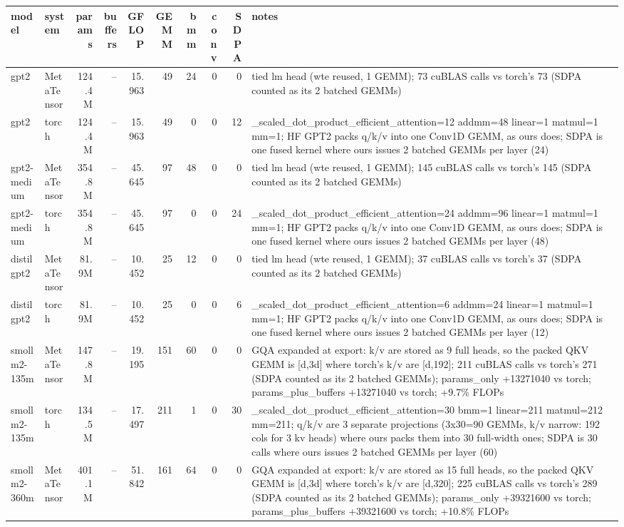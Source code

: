 \begin{tabular}{llrrrrrrrp{}}
\toprule
model & system & params & buffers & GFLOP & GEMM & bmm & conv & SDPA & notes \\
\midrule
gpt2 & MetaTensor & 124.4M & -- & 15.963 & 49 & 24 & 0 & 0 & tied lm head (wte reused, 1 GEMM); 73 cuBLAS calls vs torch's 73 (SDPA counted as its 2 batched GEMMs) \\
gpt2 & torch & 124.4M & -- & 15.963 & 49 & 0 & 0 & 12 & \_scaled\_dot\_product\_efficient\_attention=12 addmm=48 linear=1 matmul=1 mm=1; HF GPT2 packs q/k/v into one Conv1D GEMM, as ours does; SDPA is one fused kernel where ours issues 2 batched GEMMs per layer (24) \\
gpt2-medium & MetaTensor & 354.8M & -- & 45.645 & 97 & 48 & 0 & 0 & tied lm head (wte reused, 1 GEMM); 145 cuBLAS calls vs torch's 145 (SDPA counted as its 2 batched GEMMs) \\
gpt2-medium & torch & 354.8M & -- & 45.645 & 97 & 0 & 0 & 24 & \_scaled\_dot\_product\_efficient\_attention=24 addmm=96 linear=1 matmul=1 mm=1; HF GPT2 packs q/k/v into one Conv1D GEMM, as ours does; SDPA is one fused kernel where ours issues 2 batched GEMMs per layer (48) \\
distilgpt2 & MetaTensor & 81.9M & -- & 10.452 & 25 & 12 & 0 & 0 & tied lm head (wte reused, 1 GEMM); 37 cuBLAS calls vs torch's 37 (SDPA counted as its 2 batched GEMMs) \\
distilgpt2 & torch & 81.9M & -- & 10.452 & 25 & 0 & 0 & 6 & \_scaled\_dot\_product\_efficient\_attention=6 addmm=24 linear=1 matmul=1 mm=1; HF GPT2 packs q/k/v into one Conv1D GEMM, as ours does; SDPA is one fused kernel where ours issues 2 batched GEMMs per layer (12) \\
smollm2-135m & MetaTensor & 147.8M & -- & 19.195 & 151 & 60 & 0 & 0 & GQA expanded at export: k/v are stored as 9 full heads, so the packed QKV GEMM is [d,3d] where torch's k/v are [d,192]; 211 cuBLAS calls vs torch's 271 (SDPA counted as its 2 batched GEMMs); params\_only +13271040 vs torch; params\_plus\_buffers +13271040 vs torch; +9.7\% FLOPs \\
smollm2-135m & torch & 134.5M & -- & 17.497 & 211 & 1 & 0 & 30 & \_scaled\_dot\_product\_efficient\_attention=30 bmm=1 linear=211 matmul=212 mm=211; q/k/v are 3 separate projections (3x30=90 GEMMs, k/v narrow: 192 cols for 3 kv heads) where ours packs them into 30 full-width ones; SDPA is 30 calls where ours issues 2 batched GEMMs per layer (60) \\
smollm2-360m & MetaTensor & 401.1M & -- & 51.842 & 161 & 64 & 0 & 0 & GQA expanded at export: k/v are stored as 15 full heads, so the packed QKV GEMM is [d,3d] where torch's k/v are [d,320]; 225 cuBLAS calls vs torch's 289 (SDPA counted as its 2 batched GEMMs); params\_only +39321600 vs torch; params\_plus\_buffers +39321600 vs torch; +10.8\% FLOPs \\

\end{tabular}
